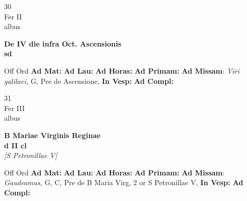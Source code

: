 \documentclass[10pt, openany]{book}
\begin{document}
    \begin{center}
        \begin{minipage}{3.5in}
            \vspace{2em}
            \begin{minipage}{0.5in}
                {\Huge 30} \\
                {\normalsize Fer II} \\
                {\normalsize albus}
            \end{minipage}
            \begin{minipage}{3.0in}
                \textbf{ \large De IV die infra Oct. Ascensionis \\
                \textnormal{\normalsize sd}} \\ 
            \end{minipage}
            \begin{justify}Off Ord
                \textbf{Ad Mat: }
                \textbf{Ad Lau: }
                \textbf{Ad Horas: }
                \textbf{Ad Primam: }\textbf{Ad Missam}: \textit{Viri galilaei,} G, Pre de Ascensione,  
                \textbf{In Vesp: }
                \textbf{Ad Compl: }
            \end{justify}
        \end{minipage}
    \end{center}

    \begin{center}
        \begin{minipage}{3.5in}
            \vspace{2em}
            \begin{minipage}{0.5in}
                {\Huge 31} \\
                {\normalsize Fer III} \\
                {\normalsize albus}
            \end{minipage}
            \begin{minipage}{3.0in}
                \textbf{ \large B Mariae Virginis Reginae \\
                \textnormal{\normalsize d II cl}} \\ \textit{[S Petronillae V]} \\ 
            \end{minipage}
            \begin{justify}Off Ord
                \textbf{Ad Mat: }
                \textbf{Ad Lau: }
                \textbf{Ad Horas: }
                \textbf{Ad Primam: }\textbf{Ad Missam}: \textit{Gaudeamus,} G, C, Pre de B Maria Virg, 2 or S Petronillae V,  
                \textbf{In Vesp: }
                \textbf{Ad Compl: }
            \end{justify}
        \end{minipage}
    \end{center}
\end{document}
